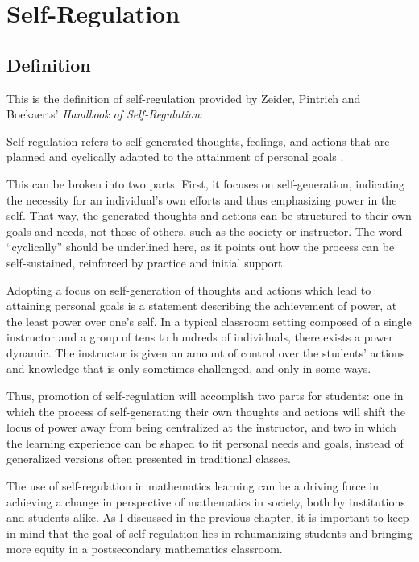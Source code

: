 \chapter{Self-Regulation}

\section{Definition}
This is the definition of self-regulation provided by Zeider, Pintrich and Boekaerts' \emph{Handbook of Self-Regulation}:
\begin{displayquote}
  Self-regulation refers to self-generated thoughts, feelings, and actions that are planned and cyclically adapted to the attainment of personal goals \citep{corte_chapter_2000}.
\end{displayquote}

This can be broken into two parts. First, it focuses on self-generation, indicating the necessity for an individual's own efforts and thus emphasizing power in the self. That way, the generated thoughts and actions can be structured to their own goals and needs, not those of others, such as the society or instructor. The word ``cyclically'' should be underlined here, as it points out how the process can be self-sustained, reinforced by practice and initial support.

Adopting a focus on self-generation of thoughts and actions which lead to attaining personal goals is a statement describing the achievement of power, at the least power over one's self. In a typical classroom setting composed of a single instructor and a group of tens to hundreds of individuals, there exists a power dynamic. The instructor is given an amount of control over the students' actions and knowledge that is only sometimes challenged, and only in some ways.

Thus, promotion of self-regulation will accomplish two parts for students: one in which the process of self-generating their own thoughts and actions will shift the locus of power away from being centralized at the instructor, and two in which the learning experience can be shaped to fit personal needs and goals, instead of generalized versions often presented in traditional classes.

The use of self-regulation in mathematics learning can be a driving force in achieving a change in perspective of mathematics in society, both by institutions and students alike. As I discussed in the previous chapter, it is important to keep in mind that the goal of self-regulation lies in rehumanizing students and bringing more equity in a postsecondary mathematics classroom.


